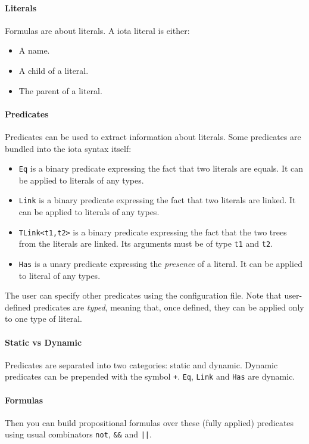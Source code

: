 \documentclass[10pt,a4paper]{article}
\newcommand{\ocaml}{\texttt}
\begin{document}
\paragraph{Literals}
Formulas are about literals. A iota literal is either:
\begin{itemize}
\item A name.
\item A child of a literal.
\item The parent of a literal.
\end{itemize}

\paragraph{Predicates}
Predicates can be used to extract information about literals. Some predicates are bundled into the iota syntax itself:
\begin{itemize}
\item \ocaml{Eq} is a binary predicate expressing the fact that two literals are equals. It can be applied to literals of any types.
\item \ocaml{Link} is a binary predicate expressing the fact that two literals are linked. It can be applied to literals of any types.
\item \ocaml{TLink<t1,t2>} is a binary predicate expressing the fact that the two trees from the literals are linked. Its arguments must be of type \ocaml{t1} and \ocaml{t2}.
\item \ocaml{Has} is a unary predicate expressing the \emph{presence} of a literal. It can be applied to literal of any types.
\end{itemize}

The user can specify other predicates using the configuration file. Note that user-defined predicates are \emph{typed}, meaning that, once defined, they can be applied only to one type of literal.

\paragraph{Static vs Dynamic}
Predicates are separated into two categories: static and dynamic. Dynamic predicates can be prepended with the symbol \ocaml{+}. \ocaml{Eq}, \ocaml{Link} and \ocaml{Has} are dynamic.

\paragraph{Formulas}
Then you can build propositional formulas over these (fully applied) predicates using usual combinators \ocaml{not}, \ocaml{&&} and \ocaml{||}.
\end{document}
